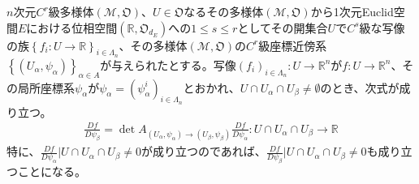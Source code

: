 \documentclass[dvipdfmx]{jsarticle}
\begin{document}
\begin{thm}\label{8.3.2.5}
$n$次元$C^{r}$級多様体$\left( \mathcal{M},\mathfrak{O} \right)$、$U \in \mathfrak{O}$なるその多様体$\left( \mathcal{M},\mathfrak{O} \right)$から1次元Euclid空間$E$における位相空間$\left( \mathbb{R},\mathfrak{O}_{d_{E}} \right)$への$1\leq s \leq r$としてその開集合$U$で$C^{s}$級な写像の族$\left\{ f_i :U \rightarrow \mathbb{R} \right\}_{i\in \varLambda_n } $、その多様体$\left( \mathcal{M},\mathfrak{O} \right)$の$C^{r}$級座標近傍系$\left\{ \left( U_{\alpha},\psi_{\alpha} \right) \right\}_{\alpha \in A}$が与えられたとする。写像$\left( f_i \right)_{i\in \varLambda_n } :U \rightarrow \mathbb{R}^n $が$f:U \rightarrow \mathbb{R}^n $、その局所座標系$\psi_\alpha $が$\psi_\alpha =\left( \psi_\alpha^i \right)_{i\in \varLambda_n }$とおかれ、$U\cap U_\alpha \cap U_\beta \ne \emptyset $のとき、次式が成り立つ。
\begin{align*}
\frac{Df}{D\psi_\beta } = \det A_{\left(U_\alpha ,\psi_\alpha \right)\rightarrow \left(U_\beta ,\psi_\beta \right)} \frac{Df}{D\psi_\alpha } : U\cap U_\alpha \cap U_\beta \rightarrow \mathbb{R}
\end{align*}
特に、$\frac{Df}{D\psi_\alpha } |U\cap U_\alpha \cap U_\beta \ne 0$が成り立つのであれば、$\frac{Df}{D\psi_\beta } |U\cap U_\alpha \cap U_\beta \ne 0$も成り立つことになる。
\end{thm}
\end{document}
